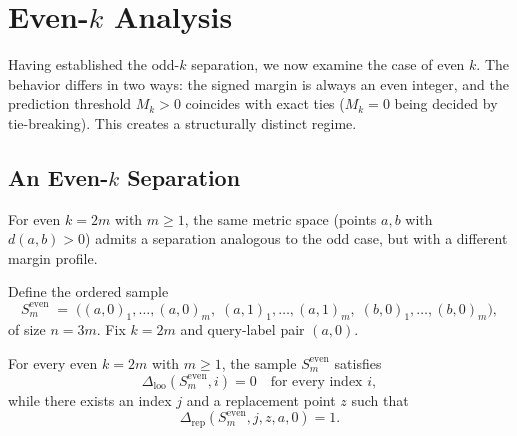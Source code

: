\section{Even-$k$ Analysis}
\label{sec:even-k-analysis}

Having established the odd-$k$ separation, we now examine the case of even
$k$. The behavior differs in two ways: the signed margin is always an even
integer, and the prediction threshold $M_k > 0$ coincides with exact ties
($M_k = 0$ being decided by tie-breaking). This creates a structurally
distinct regime.

\subsection{An Even-$k$ Separation}

For even $k = 2m$ with $m \ge 1$, the same metric space (points $a,b$ with
$d(a,b) > 0$) admits a separation analogous to the odd case, but with a
different margin profile.

Define the ordered sample
\[
S_m^{\text{even}} \;=\; \big((a,0)_1,\ldots,(a,0)_m,\;
                            (a,1)_1,\ldots,(a,1)_m,\;
                            (b,0)_1,\ldots,(b,0)_m\big),
\]
of size $n = 3m$. Fix $k = 2m$ and query-label pair $(a,0)$.

\begin{theorem}
\label{thm:even-k-separation}
For every even $k = 2m$ with $m \ge 1$, the sample $S_m^{\text{even}}$
satisfies
\[
\Delta_{\mathrm{loo}}(S_m^{\text{even}}, i) = 0 \quad \text{for every index } i,
\]
while there exists an index $j$ and a replacement point $z$ such that
\[
\Delta_{\mathrm{rep}}(S_m^{\text{even}}, j, z, a, 0) = 1.
\]
\end{theorem}

